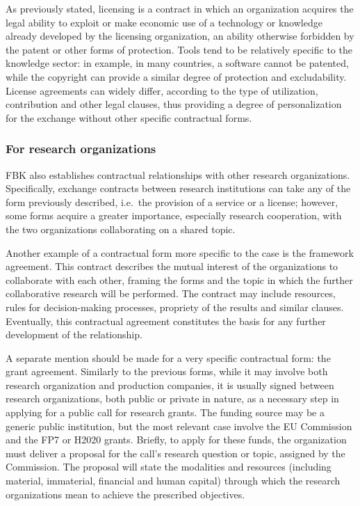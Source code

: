 As previously stated, licensing is a contract in which an organization acquires the legal ability to exploit or make economic use of a technology or knowledge already developed by the licensing organization, an ability otherwise forbidden by the patent or other forms of protection. Tools tend to be relatively specific to the knowledge sector: in example, in many countries, a software cannot be patented, while the copyright can provide a similar degree of protection and excludability. License agreements can widely differ, according to the type of utilization, contribution and other legal clauses, thus providing a degree of personalization for the exchange without other specific contractual forms.

\subsubsection{For research organizations}

FBK also establishes contractual relationships with other research organizations. Specifically, exchange contracts between research institutions can take any of the form previously described, i.e.\ the provision of a service or a license; however, some forms acquire a greater importance, especially research cooperation, with the two organizations collaborating on a shared topic.

Another example of a contractual form more specific to the case is the framework agreement. This contract describes the mutual interest of the organizations to collaborate with each other, framing the forms and the topic in which the further collaborative research will be performed. The contract may include resources, rules for decision-making processes, propriety of the results and similar clauses. Eventually, this contractual agreement constitutes the basis for any further development of the relationship.

A separate mention should be made for a very specific contractual form: the grant agreement. Similarly to the previous forms, while it may involve both research organization and production companies, it is usually signed between research organizations, both public or private in nature, as a necessary step in applying for a public call for research grants. The funding source may be a generic public institution, but the most relevant case involve the EU Commission and the FP7 or H2020 grants. Briefly, to apply for these funds, the organization must deliver a proposal for the call's research question or topic, assigned by the Commission. The proposal will state the modalities and resources (including material, immaterial, financial and human capital) through which the research organizations mean to achieve the prescribed objectives.

